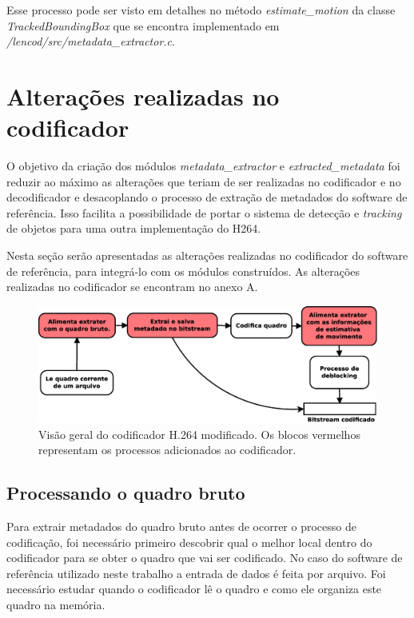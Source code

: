 Esse processo pode ser visto em detalhes no método \textit{estimate\_motion} da classe \textit{TrackedBoundingBox} que se encontra implementado em \textit{/lencod/src/metadata\_extractor.c}. 


\section{ Alterações realizadas no codificador }


O objetivo da criação dos módulos \textit{metadata\_extractor} e \textit{extracted\_metadata} foi reduzir ao máximo as alterações que teriam de ser realizadas no codificador e no decodificador e desacoplando o processo de extração de metadados do software de referência. Isso facilita a possibilidade de portar o sistema de detecção e \textit{tracking} de objetos para uma outra implementação do H264.

Nesta seção serão apresentadas as alterações realizadas no codificador do software de referência, para integrá-lo com os módulos construídos. As alterações realizadas no codificador se encontram no anexo A.


\begin{figure}[H]
\centering
\includegraphics[scale=0.45]{imagens/fig18.eps}
\caption{Visão geral do codificador H.264 modificado. Os blocos vermelhos representam os processos adicionados ao codificador.}
\label{fig:h264_moded_encoder}
\end{figure}


\subsection{ Processando o quadro bruto }

Para extrair metadados do quadro bruto antes de ocorrer o processo de codificação, foi necessário primeiro descobrir qual o melhor local dentro do codificador para se obter o quadro que vai ser codificado. No caso do software de referência utilizado neste trabalho a entrada de dados é feita por arquivo. Foi necessário estudar quando o codificador lê o quadro e como ele organiza este quadro na memória.

